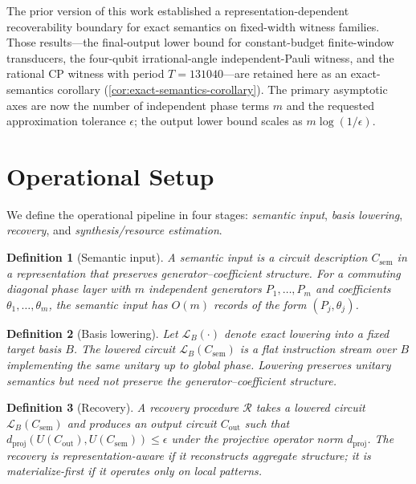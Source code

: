 \documentclass[aps,prx,reprint,floatfix,superscriptaddress]{revtex4-2}
\newtheorem{definition}{Definition}
\begin{document}
The prior version of this work established a
representation-dependent recoverability boundary for exact semantics on
fixed-width witness families. Those results---the final-output lower
bound for constant-budget finite-window transducers, the four-qubit
irrational-angle independent-Pauli witness, and the rational CP witness
with period $T=131040$---are retained here as an exact-semantics
corollary (\cref{cor:exact-semantics-corollary}). The primary asymptotic
axes are now the number of independent phase terms $m$ and the requested
approximation tolerance $\epsilon$; the output lower bound scales as
$m\log(1/\epsilon)$.


\section{Operational Setup}
\label{sec:setup}

We define the operational pipeline in four stages:
\emph{semantic input}, \emph{basis lowering}, \emph{recovery}, and
\emph{synthesis/resource estimation}.

\begin{definition}[Semantic input]
\label{def:semantic-input}
A semantic input is a circuit description $C_{\mathrm{sem}}$ in a
representation that preserves generator--coefficient structure. For a
commuting diagonal phase layer with $m$ independent generators
$P_1,\ldots,P_m$ and coefficients $\theta_1,\ldots,\theta_m$, the semantic
input has $O(m)$ records of the form $(P_j, \theta_j)$.
\end{definition}

\begin{definition}[Basis lowering]
\label{def:lowering}
Let $\mathcal{L}_B(\cdot)$ denote exact lowering into a fixed target basis
$B$. The lowered circuit $\mathcal{L}_B(C_{\mathrm{sem}})$ is a flat
instruction stream over $B$ implementing the same unitary up to global
phase. Lowering preserves unitary semantics but need not preserve the
generator--coefficient structure.
\end{definition}

\begin{definition}[Recovery]
\label{def:recovery}
A recovery procedure $\mathcal{R}$ takes a lowered circuit
$\mathcal{L}_B(C_{\mathrm{sem}})$ and produces an output circuit
$C_{\mathrm{out}}$ such that
$d_{\mathrm{proj}}(U(C_{\mathrm{out}}), U(C_{\mathrm{sem}})) \leq \epsilon$
under the projective operator norm $d_{\mathrm{proj}}$. The recovery is
\emph{representation-aware} if it reconstructs aggregate structure; it is
\emph{materialize-first} if it operates only on local patterns.
\end{definition}
\end{document}
